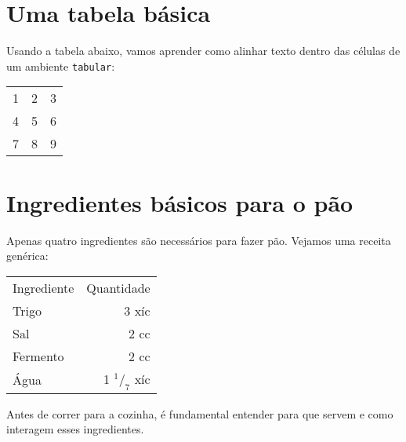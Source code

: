 \documentclass[a4paper,oneside]{article}
\begin{document}
\frenchspacing

\section{Uma tabela básica}

Usando a tabela abaixo, vamos aprender como alinhar texto dentro das células de
um ambiente \texttt{tabular}:

\begin{center}
  \begin{tabular}{l c r}
    1 & 2 & 3\\
    4 & 5 & 6\\
    7 & 8 & 9\\
  \end{tabular}
\end{center}

\section{Ingredientes básicos para o pão}

Apenas quatro ingredientes são necessários para fazer pão. Vejamos uma receita
genérica:

\begin{center}
  \begin{tabular}{lr}
    Ingrediente & Quantidade\\[5pt]
    Trigo & 3 xíc\\
    Sal & 2 cc\\
    Fermento & 2 cc\\
    Água & 1 $^1/_7$ xíc
  \end{tabular}
\end{center}

Antes de correr para a cozinha, é fundamental entender para que servem e como
interagem esses ingredientes.
\end{document}
